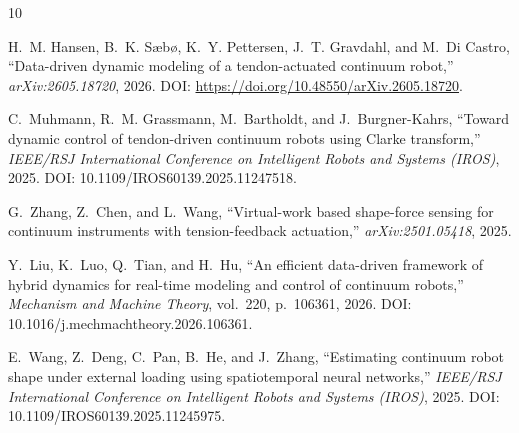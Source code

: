 \begin{thebibliography}{10}

H.~M. Hansen, B.~K. S{\ae}b{\o}, K.~Y. Pettersen, J.~T. Gravdahl, and M.~{Di Castro},
``Data-driven dynamic modeling of a tendon-actuated continuum robot,''
{\em arXiv:2605.18720}, 2026.
DOI: \url{https://doi.org/10.48550/arXiv.2605.18720}.

C.~Muhmann, R.~M. Grassmann, M.~Bartholdt, and J.~Burgner-Kahrs,
``Toward dynamic control of tendon-driven continuum robots using Clarke transform,''
{\em IEEE/RSJ International Conference on Intelligent Robots and Systems (IROS)}, 2025.
DOI: 10.1109/IROS60139.2025.11247518.

G.~Zhang, Z.~Chen, and L.~Wang,
``Virtual-work based shape-force sensing for continuum instruments with tension-feedback
actuation,'' {\em arXiv:2501.05418}, 2025.

Y.~Liu, K.~Luo, Q.~Tian, and H.~Hu,
``An efficient data-driven framework of hybrid dynamics for real-time modeling and control of
continuum robots,'' {\em Mechanism and Machine Theory}, vol.~220, p.~106361, 2026.
DOI: 10.1016/j.mechmachtheory.2026.106361.

E.~Wang, Z.~Deng, C.~Pan, B.~He, and J.~Zhang,
``Estimating continuum robot shape under external loading using spatiotemporal neural
networks,'' {\em IEEE/RSJ International Conference on Intelligent Robots and Systems (IROS)},
2025.
DOI: 10.1109/IROS60139.2025.11245975.

\end{thebibliography}


